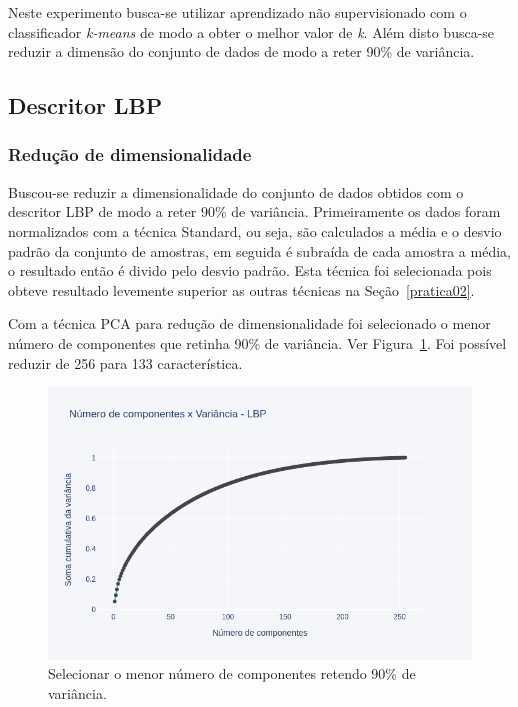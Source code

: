 \documentclass[a4paper, 12 pt, conference]{ieeeconf}  %
\begin{document}
Neste experimento busca-se utilizar aprendizado não supervisionado com o classificador \textit{k-means} de modo a obter o melhor valor de \textit{k}. Além disto busca-se reduzir a dimensão do conjunto de dados de modo a reter 90\% de variância.

\subsection{Descritor LBP}
\subsubsection{Redução de dimensionalidade}

Buscou-se reduzir a dimensionalidade do conjunto de dados obtidos com o descritor LBP de modo a reter 90\% de variância. Primeiramente os dados foram normalizados com a técnica Standard, ou seja, são calculados a média e o desvio padrão da conjunto de amostras, em seguida é subraída de cada amostra a média, o resultado então é divido pelo desvio padrão. Esta técnica foi selecionada pois obteve resultado levemente superior as outras técnicas na Seção~\ref{pratica02}.

Com a técnica PCA para redução de dimensionalidade foi selecionado o menor número de componentes que retinha 90\% de variância. Ver Figura~\ref{fig:points_pca_lbp}. Foi possível reduzir de 256 para 133 característica.

\begin{figure}[!htbp]
	\centering
	\includegraphics[width=1.0\linewidth,clip=true,trim=0cm 0cm 0cm 0cm, keepaspectratio=true]{points_pca_lbp.png}
	\caption{Selecionar o menor número de componentes retendo 90\% de variância.}
	\label{fig:points_pca_lbp}
\end{figure}
\end{document}
